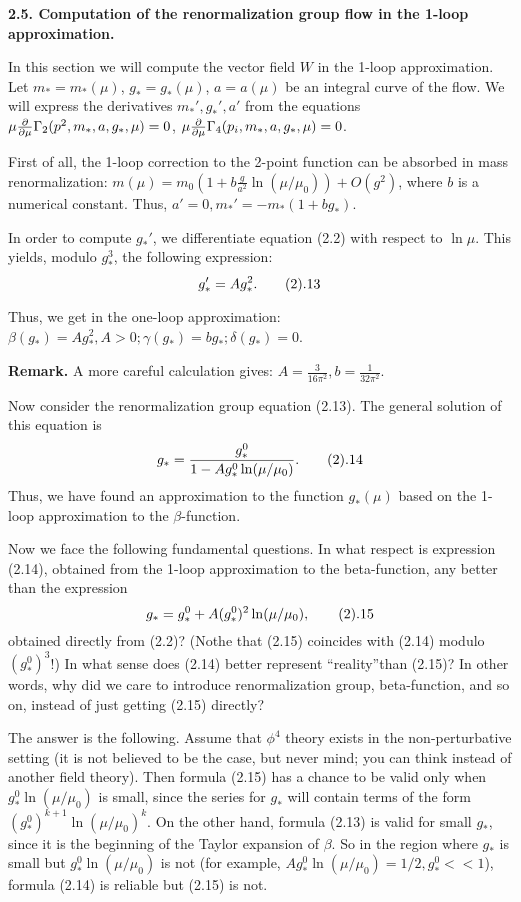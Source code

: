 {\bf 2.5. Computation of the
renormalization group flow in the 1-loop approximation.}

In this section we will compute the
vector field $W$  in the 1-loop approximation. 
Let $m_*=m_*(\mu)$, $g_*=g_*(\mu)$, $a=a(\mu)$ be an integral curve 
of the flow. We will express the derivatives  
$m_*',g_*',a'$ from the equations $\mu\frac{\partial}{\partial\mu}
\Gamma_2(p^2,m_*,a,g_*,\mu)=0$,
$\mu\frac{\partial}{\partial\mu}
\Gamma_4(p_i,m_*,a,g_*,\mu)=0$.

First of all, the 1-loop correction to the 2-point function
can be absorbed in mass renormalization:
$m(\mu)=m_0(1+b\frac{g}{a^2}
\ln(\mu/\mu_0))+O(g^2)$, where $b$ is a numerical 
constant. Thus, $a'=0, m_*'=-m_*(1+bg_*)$.

In order to compute $g_*'$, we differentiate equation (2.2) with respect 
to $\ln\mu$. This yields, modulo $g_*^3$, the following expression:
$$
g_*'=Ag_*^2.\tag 2.13
$$

Thus, we get in the one-loop approximation: $\beta(g_*)=Ag_*^2, A>0;
\gamma(g_*)=bg_*; \delta(g_*)=0$. 

{\bf Remark.} A more careful calculation gives: $A=\frac{3}{16\pi^2},
b=\frac{1}{32\pi^2}$.

Now consider the renormalization group equation (2.13).
The general solution of this equation is
$$
g_*=\frac{g_*^0}{1-Ag_*^0\ln(\mu/\mu_0)}.\tag 2.14
$$  
Thus, we have found an approximation to the function $g_*(\mu)$ based
on the 1-loop approximation to the $\beta$-function. 

Now we face the following fundamental questions.
In what respect is expression (2.14), obtained from the 1-loop 
approximation to the beta-function, any better than the expression 
$$
g_*=g_*^0+A(g_*^0)^2\ln(\mu/\mu_0),\tag 2.15
$$
obtained directly from (2.2)? (Nothe that (2.15) coincides with (2.14) modulo 
$(g_*^0)^3$!) In what sense does (2.14) better represent 
``reality''than (2.15)? In other words, why did we care to introduce
renormalization group, beta-function, and so on, instead 
of just getting (2.15) directly?

The answer is the following. Assume that $\phi^4$ theory exists in 
the non-perturbative setting (it is not believed to be the case, but
never mind; you can think instead of another field theory).
Then formula (2.15) has a chance to be valid only when $g_*^0\ln(\mu/\mu_0)$
is small, since the series for $g_*$ will contain terms of
the form $(g_*^0)^{k+1}\ln(\mu/\mu_0)^k$. On the other hand, 
formula (2.13) is valid for small $g_*$, since it is 
the beginning of the Taylor expansion of $\beta$. So in the region where
$g_*$ is small but $g_*^0\ln(\mu/\mu_0)$ is not 
(for example, $Ag_*^0\ln(\mu/\mu_0)=1/2,g_*^0<<1$), formula
(2.14) is reliable but (2.15) is not. 

